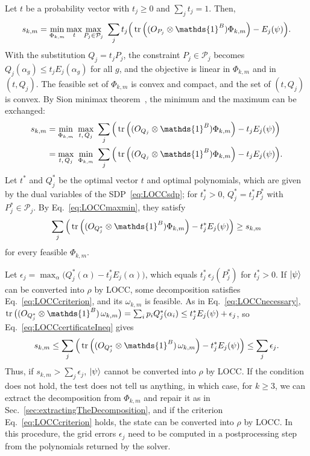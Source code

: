 \documentclass[aps,pra,twocolumn,showpacs,superscriptaddress,groupedaddress]{revtex4-2}
\newcommand{\one}[0]{\mathds{1}}
\renewcommand{\a}{\alpha}
\newcommand{\I}{\one}
\begin{document}
\begin{widetext}
Let $t$ be a probability vector with $t_j \geq 0$ and $\sum_j t_j = 1$. Then,
\begin{align}\label{eq:LOCCminmaxT}
    s_{k,m}=\min_{\Phi_{k,m}} \max_t \max_{P_j\in\mathcal{P}_j}\ \sum_j t_j\Big(\tr\left((O_{P_j}\otimes\I^B)\Phi_{k,m}\right)-E_j(\psi)\Big).
\end{align}
With the substitution $Q_j=t_jP_j$, the constraint $P_j\in\mathcal{P}_j$ becomes $Q_j(\a_g)\leq t_jE_j(\a_g)$ for all $g$, and the objective is linear in $\Phi_{k,m}$ and in $(t,Q_j)$. The feasible set of $\Phi_{k,m}$ is convex and compact, and the set of $(t,Q_j)$ is convex. By Sion minimax theorem~\cite{Sion1958}, the minimum and the maximum can be exchanged:
\begin{align}
    s_{k,m}&=\min_{\Phi_{k,m}}\ \max_{t,\,Q_j}\ \sum_j \Big(\tr\left((O_{Q_j}\otimes\I^B)\Phi_{k,m}\right)-t_jE_j(\psi)\Big)\nonumber\\
    &=\max_{t,\,Q_j}\ \min_{\Phi_{k,m}}\ \sum_j \Big(\tr\left((O_{Q_j}\otimes\I^B)\Phi_{k,m}\right)-t_jE_j(\psi)\Big).\label{eq:LOCCmaxmin}
\end{align}
Let $t^*$ and $Q_j^*$ be the optimal vector $t$ and optimal polynomials, which are given by the dual variables of the SDP~\eqref{eq:LOCCsdp}; for $t^*_j>0$, $Q^*_j=t^*_jP^*_j$ with $P^*_j\in\mathcal{P}_j$.
By Eq.~\eqref{eq:LOCCmaxmin}, they satisfy
\begin{equation}\label{eq:LOCCcertificateIneq}
    \sum_j \Big(\tr\left((O_{Q^*_j}\otimes\I^B)\Phi_{k,m}\right)-t^*_jE_j(\psi)\Big)\geq s_{k,m}
\end{equation}
for every feasible $\Phi_{k,m}$.

Let $\epsilon_j=\max_\a\big(Q^*_j(\a)-t^*_jE_j(\a)\big)$, which equals $t^*_j\,\epsilon_j(P^*_j)$ for $t^*_j>0$. If $\ket{\psi}$ can be converted into $\rho$ by LOCC, some decomposition satisfies Eq.~\eqref{eq:LOCCcriterion}, and its $\omega_{k,m}$ is feasible. As in Eq.~\eqref{eq:LOCCnecessary}, $\tr\big((O_{Q^*_j}\otimes\I^B)\,\omega_{k,m}\big)=\sum_ip_iQ^*_j(\a_i)\leq t^*_jE_j(\psi)+\epsilon_j$, so Eq.~\eqref{eq:LOCCcertificateIneq} gives
\begin{equation}
    s_{k,m} \leq \sum_j \Big(\tr\left((O_{Q^*_j}\otimes\I^B)\,\omega_{k,m}\right)-t^*_jE_j(\psi)\Big) \leq \sum_j \epsilon_j.
\end{equation}
Thus, if $s_{k,m} > \sum_j \epsilon_j$, $\ket{\psi}$ cannot be converted into $\rho$ by LOCC. If the condition does not hold, the test does not tell us anything, in which case, for $k\geq3$, we can extract the decomposition from $\Phi_{k,m}$ and repair it as in Sec.~\ref{sec:extractingTheDecomposition}, and if the criterion Eq.~\eqref{eq:LOCCcriterion} holds, the state can be converted into $\rho$ by LOCC.
In this procedure, the grid errors $\epsilon_j$ need to be computed in a postprocessing step from the polynomials returned by the solver.


\end{widetext}
\end{document}
